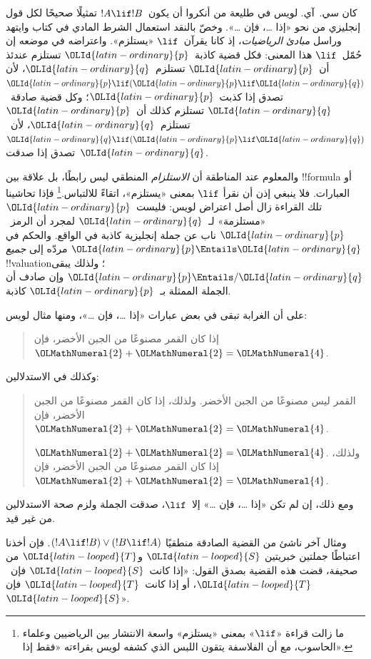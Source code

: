 \documentclass[../../../include/open-logic-section]{subfiles}
\begin{document}


كان سي.~آي. لويس في طليعة من أنكروا أن يكون~$!A \lif !B$ تمثيلًا
صحيحًا لكل قول إنجليزي من نحو «إذا \dots، فإن \dots». وخصّ بالنقد
استعمال الشرط المادي في كتاب وايتهد وراسل \emph{مبادئ الرياضيات}، إذ
كانا يقرآن~$\lif$ «يستلزم». واعتراضه في موضعه إن حُمّل~$\lif$ هذا
المعنى: فكل قضية كاذبة~$\OLId{latin-ordinary}{p}$ تستلزم عندئذ أن~$\OLId{latin-ordinary}{p}$ تستلزم~$\OLId{latin-ordinary}{q}$، لأن
$\OLId{latin-ordinary}{p} \lif (\OLId{latin-ordinary}{p} \lif \OLId{latin-ordinary}{q})$ تصدق إذا كذبت~$\OLId{latin-ordinary}{p}$؛ وكل قضية صادقة~$\OLId{latin-ordinary}{q}$ تستلزم
كذلك أن~$\OLId{latin-ordinary}{p}$ تستلزم~$\OLId{latin-ordinary}{q}$، لأن~$\OLId{latin-ordinary}{q} \lif (\OLId{latin-ordinary}{p} \lif \OLId{latin-ordinary}{q})$ تصدق إذا صدقت~$\OLId{latin-ordinary}{q}$.

والمعلوم عند المناطقة أن \emph{الاستلزام} المنطقي ليس رابطًا، بل علاقة
بين !!{formula} أو العبارات. فلا ينبغي إذن أن نقرأ
$\lif$ بمعنى «يستلزم»، اتقاءً للالتباس.\footnote{ما زالت قراءة
  «$\lif$» بمعنى «يستلزم» واسعة الانتشار بين الرياضيين وعلماء الحاسوب،
  مع أن الفلاسفة يتقون اللبس الذي كشفه لويس بقراءته «فقط إذا».} فإذا
تحاشينا تلك القراءة زال أصل اعتراض لويس: فليست~$\OLId{latin-ordinary}{p}$ «مستلزمة» لـ~$\OLId{latin-ordinary}{q}$
لمجرد أن الرمز~$\OLId{latin-ordinary}{p}$ ناب عن جملة إنجليزية كاذبة في الواقع. والحكم في
$\OLId{latin-ordinary}{p} \Entails \OLId{latin-ordinary}{q}$ مردّه إلى \emph{جميع} !!{valuation}؛ ولذلك يبقى
$\OLId{latin-ordinary}{p} \Entails/ \OLId{latin-ordinary}{q}$ وإن صادف أن الجملة الممثلة بـ~$\OLId{latin-ordinary}{p}$ كاذبة.

على أن الغرابة تبقى في بعض عبارات «إذا \dots، فإن \dots»، ومنها مثال
لويس:
\begin{quote}
إذا كان القمر مصنوعًا من الجبن الأخضر، فإن~$\OLMathNumeral{2}+\OLMathNumeral{2}=\OLMathNumeral{4}$.
\end{quote}
وكذلك في الاستدلالين:
\begin{quote}
  القمر ليس مصنوعًا من الجبن الأخضر. ولذلك، إذا كان القمر مصنوعًا
  من الجبن الأخضر، فإن~$\OLMathNumeral{2}+\OLMathNumeral{2}=\OLMathNumeral{4}$.

  $\OLMathNumeral{2}+\OLMathNumeral{2} = \OLMathNumeral{4}$. ولذلك، إذا كان القمر مصنوعًا
  من الجبن الأخضر، فإن~$\OLMathNumeral{2}+\OLMathNumeral{2}=\OLMathNumeral{4}$.
\end{quote}
ومع ذلك، إن لم تكن «إذا \dots، فإن \dots» إلا~$\lif$، صدقت الجملة
ولزم صحة الاستدلالين من غير قيد.

ومثال آخر ناشئ من القضية الصادقة منطقيًا
$(!A \lif !B) \lor (!B \lif !A)$. فإن أخذنا اعتباطًا جملتين خبريتين
$\OLId{latin-looped}{S}$ و$\OLId{latin-looped}{T}$ من صحيفة، قضت هذه القضية بصدق القول: «إذا كانت~$\OLId{latin-looped}{S}$ فإن~$\OLId{latin-looped}{T}$،
أو إذا كانت~$\OLId{latin-looped}{T}$ فإن~$\OLId{latin-looped}{S}$».
\end{document}
